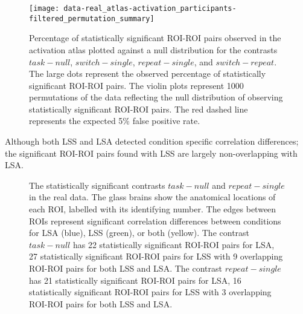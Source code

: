 \documentclass[10pt,letterpaper]{article}
\begin{document}
\begin{figure}[H]
  \texttt{[image: data-real\_atlas-activation\_participants-filtered\_permutation\_summary]}
  \caption{
    Percentage of statistically significant ROI-ROI pairs observed in the activation atlas
    plotted against a null distribution for the contrasts $task - null$, $switch - single$,
    $repeat - single$, and $switch - repeat$.
    The large dots represent the observed percentage of statistically significant ROI-ROI pairs.
    The violin plots represent 1000 permutations of the data reflecting the null distribution
    of observing statistically significant ROI-ROI pairs.
    The red dashed line represents the expected 5\% false positive rate.
  }
  \label{fig:main-result}
\end{figure}

Although both LSS and LSA detected condition specific correlation differences;
the significant ROI-ROI pairs found with LSS are largely non-overlapping with LSA.

\begin{figure}[H]
  \centering


  \caption{
   The statistically significant contrasts $task - null$ and $repeat - single$
   in the real data.
   The glass brains show the anatomical locations of each ROI,
   labelled with its identifying number.
   The edges between ROIs represent significant correlation differences
   between conditions for LSA (blue), LSS (green), or both (yellow).
   The contrast $task - null$ has 22 statistically significant ROI-ROI
   pairs for LSA, 27 statistically significant ROI-ROI pairs
   for LSS with 9 overlapping ROI-ROI pairs for both LSS and LSA.
   The contrast $repeat - single$ has 21 statistically significant ROI-ROI
   pairs for LSA, 16 statistically significant ROI-ROI pairs
   for LSS with 3 overlapping ROI-ROI pairs for both LSS and LSA. 
  }
  \label{fig:significant-contrasts}
\end{figure}
\end{document}
